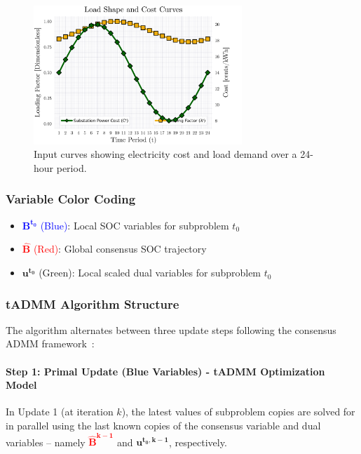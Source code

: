 \begin{figure}[h]
    \centering
    \includegraphics[width=0.7\textwidth]{figures/input-curves-cost-and-load-only-T24.png}
    \caption{Input curves showing electricity cost and load demand over a 24-hour period.}
    \label{fig:input_curves}
\end{figure}

\subsubsection{Variable Color Coding}
\begin{itemize}
    \item \textcolor{blue}{$\mathbf{B^{t_0}}$ (Blue)}: Local SOC variables for subproblem $t_0$
    \item \textcolor{red}{$\mathbf{\hat{B}}$ (Red)}: Global consensus SOC trajectory
    \item \textcolor{green!60!black}{$\mathbf{u^{t_0}}$ (Green)}: Local scaled dual variables for subproblem $t_0$
\end{itemize}

\subsubsection{tADMM Algorithm Structure}

The algorithm alternates between three update steps following the consensus ADMM framework~\cite{admm_boyd_website, admm_cmu_notes}:

\paragraph{Step 1: Primal Update (Blue Variables) - tADMM Optimization Model}

In Update 1 (at iteration $k$), the latest values of subproblem copies are solved for in parallel using the last known copies of the consensus variable and dual variables -- namely \textcolor{red}{$\mathbf{\hat{B}^{k-1}}$} and \textcolor{green!60!black}{$\mathbf{u^{t_0, k-1}}$}, respectively.

